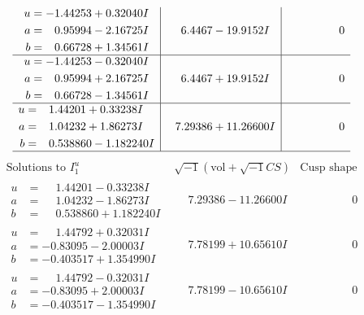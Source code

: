 \documentclass[1p]{elsarticle_modified}
\theoremstyle{definition}
\newcommand{\I}{\sqrt{-1}}
\begin{document}
$$\begin{array}{c|c|c}
\begin{aligned}
u &= -1.44253 + 0.32040 I \\
a &= \phantom{-}0.95994 - 2.16725 I \\
b &= \phantom{-}0.66728 + 1.34561 I\end{aligned}
 & \phantom{-}6.4467 - 19.9152 I & \phantom{-0.000000 } 0 \\ \hline\begin{aligned}
u &= -1.44253 - 0.32040 I \\
a &= \phantom{-}0.95994 + 2.16725 I \\
b &= \phantom{-}0.66728 - 1.34561 I\end{aligned}
 & \phantom{-}6.4467 + 19.9152 I & \phantom{-0.000000 } 0 \\ \hline\begin{aligned}
u &= \phantom{-}1.44201 + 0.33238 I \\
a &= \phantom{-}1.04232 + 1.86273 I \\
b &= \phantom{-}0.538860 - 1.182240 I\end{aligned}
 & \phantom{-}7.29386 + 11.26600 I & \phantom{-0.000000 } 0\\
 \hline 
 \end{array}$$\newpage$$\begin{array}{c|c|c}  
\text{Solutions to }I^u_{1}& \I (\text{vol} + \sqrt{-1}CS) & \text{Cusp shape}\\
 \hline 
\begin{aligned}
u &= \phantom{-}1.44201 - 0.33238 I \\
a &= \phantom{-}1.04232 - 1.86273 I \\
b &= \phantom{-}0.538860 + 1.182240 I\end{aligned}
 & \phantom{-}7.29386 - 11.26600 I & \phantom{-0.000000 } 0 \\ \hline\begin{aligned}
u &= \phantom{-}1.44792 + 0.32031 I \\
a &= -0.83095 - 2.00003 I \\
b &= -0.403517 + 1.354990 I\end{aligned}
 & \phantom{-}7.78199 + 10.65610 I & \phantom{-0.000000 } 0 \\ \hline\begin{aligned}
u &= \phantom{-}1.44792 - 0.32031 I \\
a &= -0.83095 + 2.00003 I \\
b &= -0.403517 - 1.354990 I\end{aligned}
 & \phantom{-}7.78199 - 10.65610 I & \phantom{-0.000000 } 0 \\ \hline\begin{aligned}

\end{aligned}
\end{array}$$
\end{document}
